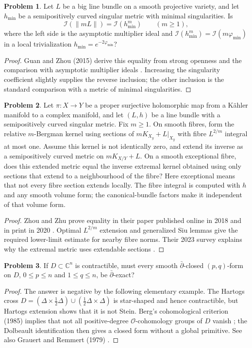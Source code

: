 \documentclass[11pt,reqno]{amsart}
\theoremstyle{definition}
\newtheorem{problem}{Problem}[section]
\theoremstyle{remark}
\begin{document}
\begin{problem}\label{Z-DEL}
Let $L$ be a big line bundle on a smooth projective variety, and let $h_{\min}$ be a semipositively curved singular metric with minimal singularities. Is
\[
 \mathcal I(\|mL\|)=\mathcal I(h_{\min}^{m})\qquad(m\geq1),
\]
where the left side is the asymptotic multiplier ideal and $\mathcal I(h_{\min}^m)=\mathcal I(m\varphi_{\min})$ in a local trivialization $h_{\min}=e^{-2\varphi_{\min}}$?
\end{problem}
\begin{proof}
Guan and Zhou (2015) derive this equality from strong openness and the comparison with asymptotic multiplier ideals \cite[\S3.4.1]{Z-GZopen}. Increasing the singularity coefficient slightly supplies the reverse inclusion; the other inclusion is the standard comparison with a metric of minimal singularities.
\end{proof}

\begin{problem}\label{Z-metrics}
Let $\pi:X\to Y$ be a proper surjective holomorphic map from a K\"ahler manifold to a complex manifold, and let $(L,h)$ be a line bundle with a semipositively curved singular metric. Fix $m\geq1$. On smooth fibres, form the relative $m$-Bergman kernel using sections of $mK_{X_y}+L|_{X_y}$ with fibre $L^{2/m}$ integral at most one. Assume this kernel is not identically zero, and extend its inverse as a semipositively curved metric on $mK_{X/Y}+L$. On a smooth exceptional fibre, does this extended metric equal the inverse extremal kernel obtained using only sections that extend to a neighbourhood of the fibre? Here exceptional means that not every fibre section extends locally. The fibre integral is computed with $h$ and any smooth volume form; the canonical-bundle factors make it independent of that volume form.
\end{problem}
\begin{proof}
Zhou and Zhu prove equality in their paper published online in 2018 and in print in 2020 \cite{Z-ZZ2020}. Optimal $L^{2/m}$ extension and generalized Siu lemmas give the required lower-limit estimate for nearby fibre norms. Their 2023 survey explains why the extremal metric uses extendable sections \cite{Z-ZZsurvey}.
\end{proof}

\begin{problem}\label{Z-contract}
If $D\subset\mathbb C^n$ is contractible, must every smooth $\bar\partial$-closed $(p,q)$-form on $D$, $0\leq p\leq n$ and $1\leq q\leq n$, be $\bar\partial$-exact?
\end{problem}
\begin{proof}
The answer is negative by the following elementary example. The Hartogs cross
$D=(\Delta\times\frac12\Delta)\cup(\frac12\Delta\times\Delta)$
is star-shaped and hence contractible, but Hartogs extension shows that it is not Stein. Berg's cohomological criterion (1985) implies that not all positive-degree $\mathcal O$-cohomology groups of $D$ vanish \cite{Z-Berg}; the Dolbeault identification then gives a closed form without a global primitive. See also Grauert and Remmert (1979) \cite{Z-GR}.
\end{proof}
\end{document}
